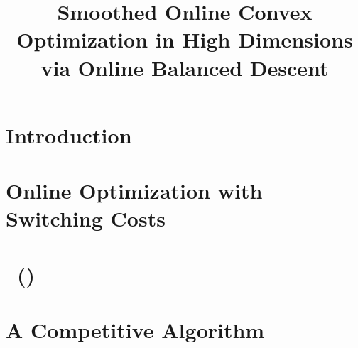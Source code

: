 \documentclass[final, 12pt]{colt2018} %
\title{ Smoothed Online Convex Optimization in High Dimensions  \quad \\ via Online Balanced Descent}
\begin{document}
\maketitle



\begin{abstract}

\end{abstract}

\section{Introduction}
\label{sec: introduction}


\section{Online Optimization with Switching Costs}
\label{sec: model}


\section{\ouralg\ (\ourack)}
\label{sec: alg-meta}



\section{A Competitive Algorithm}
\label{sec: alg-cr}

\end{document}
